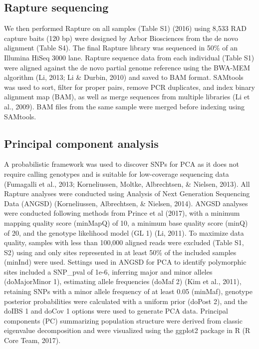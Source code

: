 \documentclass[twoside,12pt,final]{ucthesis-CA2012} %
\begin{document}
\begin{ucmainmatter}
\hypertarget{rapture-sequencing}{%
\subsection{Rapture sequencing}\label{rapture-sequencing}}

We then performed Rapture on all samples (Table S1) (2016) using 8,533
RAD capture baits (120 bp) were designed by Arbor Biosciences from the
de novo alignment (Table S4). The final Rapture library was sequenced in
50\% of an Illumina HiSeq 3000 lane. Rapture sequence data from each
individual (Table S1) were aligned against the de novo partial genome
reference using the BWA-MEM algorithm (Li, 2013; Li \& Durbin, 2010) and
saved to BAM format. SAMtools was used to sort, filter for proper pairs,
remove PCR duplicates, and index binary alignment map (BAM), as well as
merge sequences from multiple libraries (Li et al., 2009). BAM files
from the same sample were merged before indexing using SAMtools.

\hypertarget{principal-component-analysis}{%
\subsection{Principal component
analysis}\label{principal-component-analysis}}

A probabilistic framework was used to discover SNPs for PCA as it does
not require calling genotypes and is suitable for low-coverage
sequencing data (Fumagalli et al., 2013; Korneliussen, Moltke,
Albrechtsen, \& Nielsen, 2013). All Rapture analyses were conducted
using Analysis of Next Generation Sequencing Data (ANGSD) (Korneliussen,
Albrechtsen, \& Nielsen, 2014). ANGSD analyses were conducted following
methods from Prince et al (2017), with a minimum mapping quality score
(minMapQ) of 10, a minimum base quality score (minQ) of 20, and the
genotype likelihood model (GL 1) (Li, 2011). To maximize data quality,
samples with less than 100,000 aligned reads were excluded (Table S1,
S2) using and only sites represented in at least 50\% of the included
samples (minInd) were used. Settings used in ANGSD for PCA to identify
polymorphic sites included a SNP\_pval of 1e-6, inferring major and
minor alleles (doMajorMinor 1), estimating allele frequencies (doMaf 2)
(Kim et al., 2011), retaining SNPs with a minor allele frequency of at
least 0.05 (minMaf), genotype posterior probabilities were calculated
with a uniform prior (doPost 2), and the doIBS 1 and doCov 1 options
were used to generate PCA data. Principal components (PC) summarizing
population structure were derived from classic eigenvalue decomposition
and were visualized using the ggplot2 package in R (R Core Team, 2017).


\end{ucmainmatter}
\end{document}
